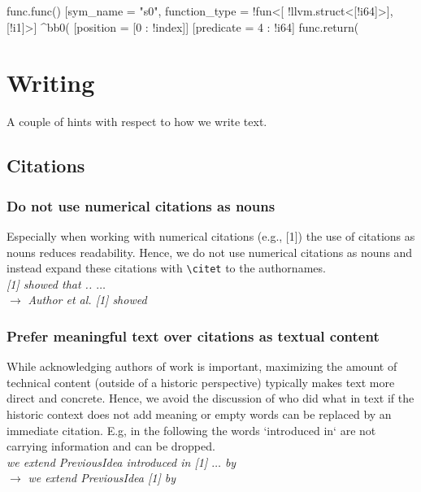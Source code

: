 \documentclass[a4paper]{article}
\newenvironment{draftonly}{}{}
\begin{document}
\begin{draftonly}
\begin{xdsl}
func.func() [sym_name = "s0", function_type = !fun<[
    !llvm.struct<[!i64]>], [!i1]>] {
  ^bb0(%
              [position = [0 : !index]]
              [predicate = 4 : !i64]
    func.return(%
}
\end{xdsl}

\section{Writing}

A couple of hints with respect to how we write text.

\subsection{Citations}
\label{appendix:citations}

\subsubsection{Do not use numerical citations as nouns}
Especially when working with numerical citations (e.g., [1]) the use of
citations as nouns reduces readability. Hence, we do not use numerical citations
as nouns and instead expand these citations with \texttt{\textbackslash{}citet} to the
authornames.
\\
{\color{pairedTwoDarkBlue}
\textit{[1] showed that .. $\dots$}}\\
$\to$ {\color{pairedFourDarkGreen}\textit{Author et al. [1] showed}}

\subsubsection{Prefer meaningful text over citations as textual content}
While acknowledging authors of work is important, maximizing the amount of technical
content (outside of a historic perspective) typically makes text more direct and
concrete. Hence, we avoid the discussion of who did what in text if the
historic context does not add meaning or empty words can be replaced by an immediate
citation. E.g, in the following the words `introduced in` are not carrying
information and can be dropped.\\
{\color{pairedTwoDarkBlue}
\textit{we extend PreviousIdea introduced in [1] $\dots$ by}}\\
$\to$ {\color{pairedFourDarkGreen}\textit{we extend PreviousIdea [1] by}}



\end{draftonly}
\end{document}
